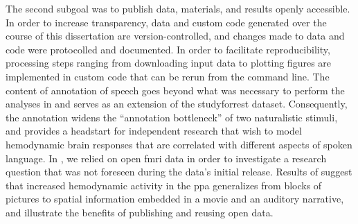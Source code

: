 
%

%
The second subgoal was to publish data, materials, and results openly
accessible.
%
In order to increase transparency, data and custom code generated over the
course of this dissertation are version-controlled, and changes made to data and
code were protocolled and documented.
%
In order to facilitate reproducibility, processing steps ranging from
downloading input data to plotting figures are implemented in custom code that
can be rerun from the command line.
%
The content of annotation of speech \citep{haeusler2021speechanno} goes beyond
what was necessary to perform the analyses in \citet{haeusler2022processing} and
serves as an extension of the studyforrest dataset.
%
Consequently, the annotation widens the ``annotation bottleneck'' \citep[][p.
16]{aliko2020naturalistic} of two naturalistic stimuli, and provides a headstart
for independent research that wish to model hemodynamic brain responses that are
correlated with different aspects of spoken language.
%
In \citet{haeusler2022processing}, we relied on open \ac{fmri} data in order to
investigate a research question that was not foreseen during the data's initial
release.
%
Results of \citet{haeusler2022processing} suggest that increased hemodynamic
activity in the \ac{ppa} generalizes from blocks of pictures to spatial
information embedded in a movie and an auditory narrative, and illustrate the
benefits of publishing and reusing open data.

